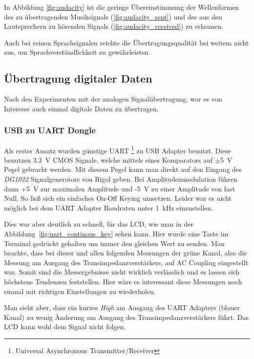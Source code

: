 \documentclass[12pt,a4paper]{article}
\begin{document}
In Abbildung \ref{fig:audacity} ist die geringe Übereinstimmung der Wellenformen des zu übertragenden Musiksignals (\ref{fig:audacity_sent}) und des aus den Lautsprechern zu hörenden Signals (\ref{fig:audacity_received}) zu erkennen.

Auch bei reinen Sprachsignalen reichte die Übertragungsqualität bei weitem nicht aus, um Sprachverständlichkeit zu gewährleisten.

\subsection{Übertragung digitaler Daten}
Nach den Experimenten mit der analogen Signalübertragung, war es von Interesse auch einmal digitale Daten zu übertragen.

\subsubsection{USB zu UART Dongle}
Als erster Ansatz wurden günstige UART \footnote{Universal Asynchronous Transmitter/Receiver} zu USB Adapter benutzt. Diese benutzen \SI{3.3}{\volt}  CMOS Signale, welche mittels eines Komparators auf $\pm$\SI{5}{\volt} Pegel gebracht werden. Mit diesem Pegel kann man direkt auf den Eingang des \textit{DG1022} Signalgenerators von Rigol geben. Bei Amplitudenmodulation führen dann +\SI{5}{\volt} zur maximalen Amplitude und -\SI{5}{\volt}  zu einer Amplitude von fast Null. So ließ sich ein einfaches On-Off Keying umsetzen. Leider war es nicht möglich bei dem UART Adapter Baudraten unter \SI{1}{\kilo\hertz} einzustellen.

Dies war aber deutlich zu schnell, für das LCD, wie man in der Abbildung~\ref{fig:uart_continous_key} sehen kann. Hier wurde eine Taste im Terminal gedrückt gehalten um immer den gleichen Wert zu senden. Man beachte, dass bei dieser und allen folgenden Messungen der grüne Kanal, also die Messung am Ausgang des Transimpedanzverstärkers, auf AC Coupling eingestellt war. Somit sind die Messergebnisse nicht wirklich verlässlich und es lassen sich höchstens Tendenzen feststellen. Hier wäre es interessant diese Messungen noch einmal mit richtigen Einstellungen zu wiederholen.

Man sieht aber, dass ein kurzes \textit{High} am Ausgang des UART Adapters (blauer Kanal) zu wenig Änderung am Ausgang des Transimpedanzverstärkers führt. Das LCD kann wohl dem Signal nicht folgen.
\end{document}
